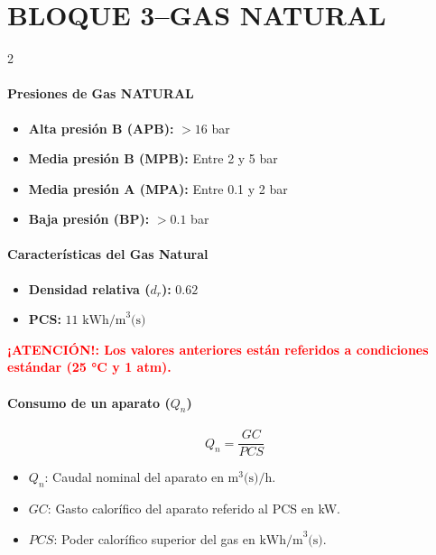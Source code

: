 \documentclass[11pt]{article}
\begin{document}
\section*{BLOQUE 3--GAS NATURAL}
\begin{multicols*}{2}

    \paragraph*{Presiones de Gas NATURAL}
    \begin{itemize}
        \item \textbf{Alta presión B (APB):} $> 16$ bar
        \item \textbf{Media presión B (MPB):} Entre 2 y 5 bar
        \item \textbf{Media presión A (MPA):} Entre 0.1 y 2 bar
        \item \textbf{Baja presión (BP):} $>0.1$ bar
    \end{itemize}

    \paragraph*{Características del Gas Natural}
    \begin{itemize}
        \item \textbf{Densidad relativa ($d_r$):} $0.62$
        \item \textbf{PCS:} $11 \text{ kWh/m}^3\text{(s)}$
    \end{itemize}

    \textcolor{red}{\textbf{¡ATENCIÓN!: Los valores anteriores están referidos a condiciones estándar (25 \unit{\celsius} y 1 atm).}}

    \paragraph*{Consumo de un aparato ($Q_n$)}
    \begin{equation}
        Q_n = \frac{GC}{PCS}
    \end{equation}
    \begin{itemize}
        \item $Q_n$: Caudal nominal del aparato en $\text{m}^3\text{(s)/h}$.
        \item $GC$: Gasto calorífico del aparato referido al PCS en kW.
        \item $PCS$: Poder calorífico superior del gas en $\text{kWh/m}^3\text{(s)}$.
    \end{itemize}


\end{multicols*}
\end{document}
